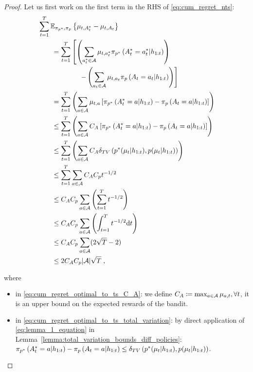 \begin{proof}
Let us first work on the first term in the RHS of \autoref{eq:cum_regret_nts}:
\begin{align}
&\sum_{t=1}^T \mathbb{E}_{\pi_{p^*},\pi_{p}}\left\{ \mu_{t,A^*_t}-\mu_{t,A_t}  \right\} \\
&\qquad =\sum_{t=1}^T \left[ \left(\sum_{a^*_t \in \mathcal{A}}\mu_{t,a^*_t} \pi_{p^*}\left( A^*_t=a^*_t|h_{1:t} \right)\right) \right. \\
&\qquad \qquad \qquad  \left. - \left( \sum_{a_t \in \mathcal{A}}\mu_{t,a_t} \pi_{p}\left( A_t=a_t|h_{1:t} \right)\right)\right]\\
&\qquad =\sum_{t=1}^T \left(\sum_{a \in \mathcal{A}} \mu_{t,a} \left[\pi_{p^*}\left( A^*_t=a|h_{1:t} \right)-\pi_{p}\left( A_t=a|h_{1:t} \right)\right] \right) \\
&\qquad \leq \sum_{t=1}^T \left(\sum_{a \in \mathcal{A}} C_A \left[\pi_{p^*}\left( A^*_t=a|h_{1:t} \right)-\pi_{p}\left( A_t=a|h_{1:t} \right)\right]  \right) \label{eq:cum_regret_optimal_to_ts_C_A} \\
&\qquad \leq \sum_{t=1}^T \left(\sum_{a \in \mathcal{A}} C_A \delta_{TV} \left(p^*(\mu_t|h_{1:t}),p(\mu_t|h_{1:t})\right) \right) \label{eq:cum_regret_optimal_to_ts_total_variation} \\
&\qquad \leq  \sum_{t=1}^T \sum_{a \in \mathcal{A}} C_A C_p t^{-1/2} \label{eq:cum_regret_optimal_to_ts_total_variation_convergence} \\
&\qquad \leq C_A C_p \sum_{a \in \mathcal{A}} \left(\sum_{t=1}^{T} t^{-1/2} \right) \label{eq:cum_regret_optimal_to_ts_rearrange_sum} \\
&\qquad \leq C_A C_p \sum_{a \in \mathcal{A}} \left(\int_{t=1}^{T} t^{-1/2} \mathrm{d} t \right) \label{eq:cum_regret_optimal_to_ts_sum_t_integral} \\
&\qquad \leq C_A C_p \sum_{a \in \mathcal{A}} (2 \sqrt{T} - 2) \label{eq:cum_regret_optimal_to_ts_algebra_on_t_integral_solution} \\
&\qquad \leq 2 C_A C_p |\mathcal{A}| \sqrt{T} \; ,\label{eq:cum_regret_optimal_to_ts_algebra_on_t_sum_a}
\end{align}

where
\begin{itemize}
	\item in \autoref{eq:cum_regret_optimal_to_ts_C_A}: we define $C_A \coloneqq \max_{a \in \mathcal{A}} \mu_{a,t}, \forall t$, \ie it is an upper bound on the expected rewards of the bandit.
	
	\item in \autoref{eq:cum_regret_optimal_to_ts_total_variation}: by direct application of \autoref{eq:lemma_1_equation} in Lemma~\ref{lemma:total_variation_bounds_diff_policies}:
	$\pi_{p^*}\left( A^*_t=a|h_{1:t} \right)-\pi_{p}\left( A_t=a|h_{1:t} \right) \leq \delta_{TV} \left(p^*(\mu_t|h_{1:t}),p(\mu_t|h_{1:t})\right)$.
	

\end{itemize}
\end{proof}
